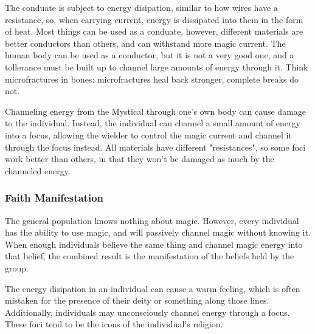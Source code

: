 \documentclass[
a4paper,
10pt,
twoside,
prd,
aps,
nofootinbib,
superscriptaddress,
floatfix,
preprintnumbers,
]{article}
\begin{document}
The conduate is subject to energy disipation, similar to how wires have a resistance, so, when carrying current, energy is dissipated into them in the form of heat.
Most things can be used as a conduate, however, different materials are better conductors than others, and can withstand more magic current.
The human body can be used as a conductor, but it is not a very good one, and a tollerance must be built up to channel large amounts of energy through it.
Think microfractures in bones: microfractures heal back stronger, complete breaks do not.

Channeling energy from the Mystical through one's own body can cause damage to the individual.
Instead, the individual can channel a small amount of energy into a focus, allowing the wielder to control the magic current and channel it through the focus instead.
All materials have different "resistances", so some foci work better than others, in that they won't be damaged as much by the channeled energy.

\subsubsection{Faith Manifestation}

The general population knows nothing about magic.
However, every individual has the ability to use magic, and will passively channel magic without knowing it.
When enough individuals believe the same thing and channel magic energy into that belief, the combined result is the manifestation of the beliefs held by the group.

The energy disipation in an individual can cause a warm feeling, which is often mistaken for the presence of their deity or something along those lines.
Additionally, individuals may unconsciously channel energy through a focus.
These foci tend to be the icons of the individual's religion.



\stopmcols
\end{document}
